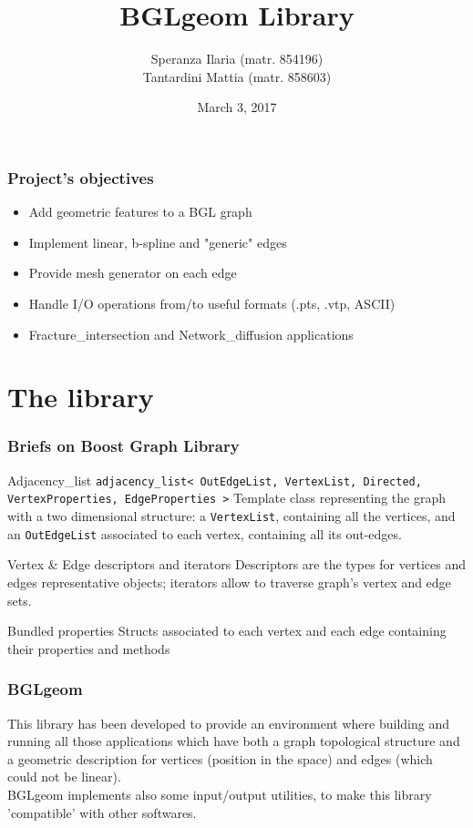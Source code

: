 \documentclass[11pt]{beamer}
\author{Speranza Ilaria (matr. 854196) \\ Tantardini Mattia (matr. 858603)}
\title{BGLgeom Library}
\institute{\textbf{Politecnico di Milano}}
\date{March 3, 2017}
\begin{document}
	\begin{frame}
		\maketitle
	\end{frame}

	\begin{frame}
		\frametitle{Project's objectives}
		\begin{itemize}
			\item Add geometric features to a BGL graph 
			\item Implement linear, b-spline and "generic" edges
			\item Provide mesh generator on each edge
			\item Handle I/O operations from/to useful formats (.pts, .vtp, ASCII) 
			\item Fracture\_intersection and Network\_diffusion applications 
		\end{itemize}
	\end{frame}

	\section{The library}
		\begin{frame}
			\frametitle{Briefs on Boost Graph Library}
			\begin{block}{Adjacency\_list}
				\texttt{adjacency\_list< OutEdgeList, VertexList, Directed, VertexProperties, EdgeProperties >} \newline
				Template class representing the graph with a two dimensional structure: 
				a \texttt{VertexList}, containing all the vertices, and an \texttt{OutEdgeList} associated to each vertex, containing all its out-edges.
			\end{block}
		
			\begin{block}{Vertex \& Edge descriptors and iterators}
				Descriptors are the types for vertices and edges representative objects; iterators allow to traverse graph's vertex and edge sets.
			\end{block}
		
			\begin{block}{Bundled properties}
				Structs associated to each vertex and each edge containing their properties and methods
			\end{block}	
		\end{frame}
	
		\begin{frame}
			\frametitle{BGLgeom}
			This library has been developed to provide an environment where building and running all those applications which have both a graph topological structure and a geometric description for vertices (position in the space) and edges (which could not be linear).\\
			BGLgeom implements also some input/output utilities, to make this library 'compatible' with other softwares.
		\end{frame}
	
\end{document}
